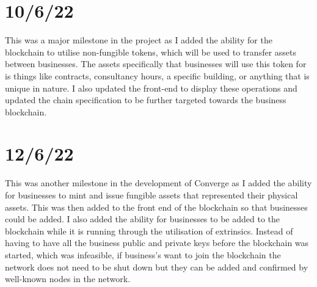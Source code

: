 \section{10/6/22}
This was a major milestone in the project as I added the ability for the blockchain to utilise non-fungible tokens, which will be used to transfer assets between businesses. The assets specifically that businesses will use this token for is things like contracts, consultancy hours, a specific building, or anything that is unique in nature. I also updated the front-end to display these operations and updated the chain specification to be further targeted towards the business blockchain. \\
\section{12/6/22}
This was another milestone in the development of Converge as I added the ability for businesses to mint and issue fungible assets that represented their physical assets. This was then added to the front end of the blockchain so that businesses could be added. I also added the ability for businesses to be added to the blockchain while it is running through the utilisation of extrinsics. Instead of having to have all the business public and private keys before the blockchain was started, which was infeasible, if business’s want to join the blockchain the network does not need to be shut down but they can be added and confirmed by well-known nodes in the network. 
